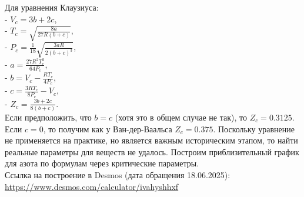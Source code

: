 \documentclass[a4paper]{article}
\numberwithin{equation}{subsection} %
\begin{document}
Для уравнения Клаузиуса:\\
- $V_c = 3b + 2c$,\\
- $T_c = \sqrt{\frac{8a}{27R(b+c)}}$,\\
- $P_c = \frac{1}{18}\sqrt{\frac{3aR}{2(b+c)^3}}$,\\
- $a = \frac{27R^2T_c^3}{64P_c}$,\\
- $b = V_c - \frac{RT_c}{4P_c}$,\\
- $c = \frac{3RT_c}{8P_c} - V_c$,\\
- $Z_c = \frac{3b + 2c}{8(b+c)}$.\\
Если предположить, что $b = c$ (хотя это в общем случае не так), то $Z_c = 0.3125$. Если $c = 0$, то получим как у Ван-дер-Ваальса $Z_c = 0.375$.
Поскольку уравнение не применяется на практике, но является важным историческим этапом, то найти реальные параметры для веществ не удалось. Построим приблизительный график для азота по формулам через критические параметры.\\
Ссылка на построение в Desmos (дата обращения 18.06.2025): \href{https://www.desmos.com/calculator/ivahyshhxf}{https://www.desmos.com/calculator/ivahyshhxf}
\clearpage
\end{document}
